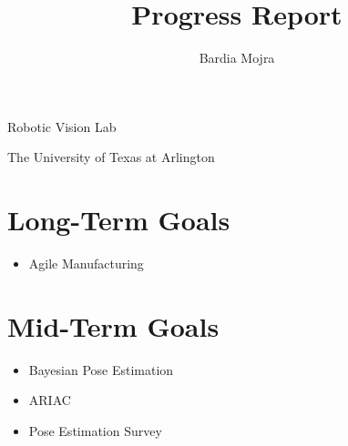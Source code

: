 \documentclass[11pt]{article}
\title{Progress Report}
\author{Bardia Mojra}
\begin{document}
\maketitle
\thispagestyle{empty}

\bigskip
\bigskip
\begin{center}
Robotic Vision Lab
\end{center}

\begin{center}
The University of Texas at Arlington
\end{center}

\newpage
\section{Long-Term Goals}
\begin{itemize}
    \item Agile Manufacturing 
\end{itemize}

\section{Mid-Term Goals}
\begin{itemize}
    \item Bayesian Pose Estimation 
    \item ARIAC
    \item Pose Estimation Survey 
\end{itemize}
\end{document}
